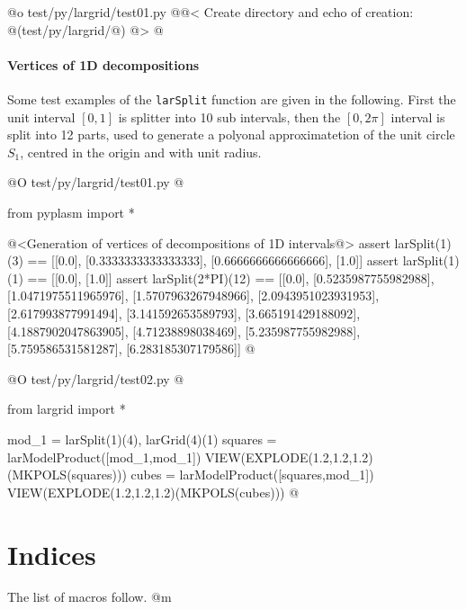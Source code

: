 \documentclass[11pt,oneside]{article}	%
\begin{document}
@o test/py/largrid/test01.py
@{@< Create directory  and echo of creation: @(test/py/largrid/@) @>
@}


\paragraph{Vertices of 1D decompositions}
Some test examples of the \texttt{larSplit} function are given in the following. First the unit interval $[0,1]$ is splitter into 10 sub intervals, then the $[0,2\pi]$ interval is split into 12 parts, used to generate a polyonal approximatetion of the unit circle $S_1$, centred in the origin and with unit radius.

@O test/py/largrid/test01.py
@{from pyplasm import *

@<Generation of vertices of decompositions of 1D intervals@>
assert larSplit(1)(3) == [[0.0], [0.3333333333333333], [0.6666666666666666], [1.0]]
assert larSplit(1)(1) == [[0.0], [1.0]]
assert larSplit(2*PI)(12) == [[0.0], [0.5235987755982988], [1.0471975511965976], 
[1.5707963267948966], [2.0943951023931953], [2.617993877991494], 
[3.141592653589793], [3.665191429188092], [4.1887902047863905], 
[4.71238898038469], [5.235987755982988], [5.759586531581287], 
[6.283185307179586]]
@}


@O test/py/largrid/test02.py
@{from largrid import *

mod_1 = larSplit(1)(4), larGrid(4)(1)
squares = larModelProduct([mod_1,mod_1])
VIEW(EXPLODE(1.2,1.2,1.2)(MKPOLS(squares)))
cubes = larModelProduct([squares,mod_1])
VIEW(EXPLODE(1.2,1.2,1.2)(MKPOLS(cubes)))
@}


\section{Indices}
\label{sec:indices}

The list of macros follow.
@m

\appendix
\end{document}
